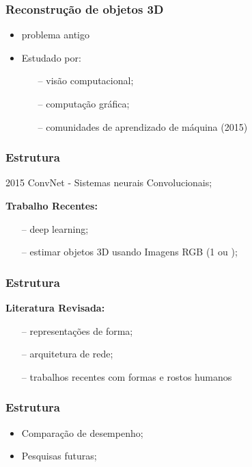 \begin{frame}
  \titlepage
\end{frame}


\begin{frame}
\frametitle{Reconstrução de objetos 3D}

\begin{itemize}
  \item problema antigo
  \item Estudado por:
  \begin{itemize}
    \item[--] visão computacional;
    \item[--] computação gráfica;
    \item[--] comunidades de aprendizado de máquina (2015)
  \end{itemize}
\end{itemize}

\end{frame}


\begin{frame}
\frametitle{Estrutura}

2015 ConvNet - Sistemas neurais Convolucionais;

\textbf{Trabalho Recentes:}
\begin{itemize}
  \item[--] deep learning;
  \item[--] estimar objetos 3D usando Imagens RGB (1 ou \infty);
\end{itemize}

\end{frame}


\begin{frame}
\frametitle{Estrutura}

\textbf{Literatura Revisada:}
\begin{itemize}
    \item[--] representações de forma;
    \item[--] arquitetura de rede;
    \item[--] trabalhos recentes com formas e rostos humanos
\end{itemize}

\end{frame}


\begin{frame}
\frametitle{Estrutura}

\begin{itemize}
  \item Comparação de desempenho;
  \item Pesquisas futuras;
\end{itemize}

\end{frame}

